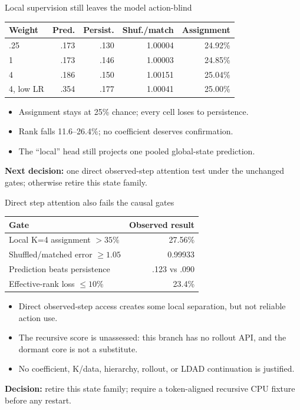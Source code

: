 \documentclass[aspectratio=169]{beamer}
\begin{document}
\begin{frame}{Local supervision still leaves the model action-blind}
  \centering
  \begin{tabular}{lrrrr}
    \toprule
    Weight & Pred. & Persist. & Shuf./match & Assignment \\
    \midrule
    .25 & .173 & .130 & 1.00004 & 24.92\% \\
    1 & .173 & .146 & 1.00003 & 24.85\% \\
    4 & .186 & .150 & 1.00151 & 25.04\% \\
    4, low LR & .354 & .177 & 1.00041 & 25.00\% \\
    \bottomrule
  \end{tabular}
  \vfill
  \begin{itemize}
    \item Assignment stays at 25\% chance; every cell loses to persistence.
    \item Rank falls 11.6--26.4\%; no coefficient deserves confirmation.
    \item The ``local'' head still projects one pooled global-state prediction.
  \end{itemize}
  \textbf{Next decision:} one direct observed-step attention test under the unchanged gates; otherwise retire this state family.
\end{frame}

\begin{frame}{Direct step attention also fails the causal gates}
  \centering
  \begin{tabular}{lr}
    \toprule
    Gate & Observed result \\
    \midrule
    Local K=4 assignment $>35\%$ & 27.56\% \\
    Shuffled/matched error $\geq 1.05$ & 0.99933 \\
    Prediction beats persistence & .123 vs .090 \\
    Effective-rank loss $\leq 10\%$ & 23.4\% \\
    \bottomrule
  \end{tabular}
  \vfill
  \begin{itemize}
    \item Direct observed-step access creates some local separation, but not reliable action use.
    \item The recursive score is unassessed: this branch has no rollout API, and the dormant core is not a substitute.
    \item No coefficient, K/data, hierarchy, rollout, or LDAD continuation is justified.
  \end{itemize}
  \textbf{Decision:} retire this state family; require a token-aligned recursive CPU fixture before any restart.
\end{frame}
\end{document}

